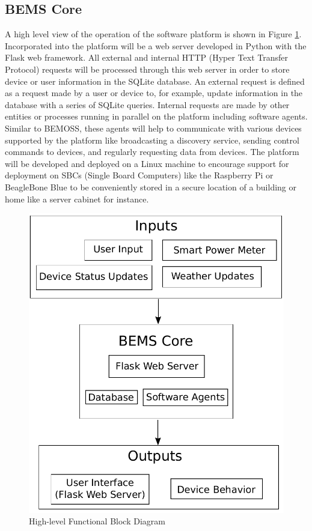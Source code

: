 \documentclass[12pt]{article} %
\begin{document}
\subsection{BEMS Core}
A high level view of the operation of the software platform is shown in Figure \ref{fig:functionalBlockDiagram}. Incorporated into the platform will be a web server developed in Python with the Flask web framework. All external and internal HTTP (Hyper Text Transfer Protocol) requests will be processed through this web server in order to store device or user information in the SQLite database. An external request is defined as a request made by a user or device to, for example, update information in the database with a series of SQLite queries. Internal requests are made by other entities or processes running in parallel on the platform including software agents. Similar to BEMOSS, these agents will help to communicate with various devices supported by the platform like broadcasting a discovery service, sending control commands to devices, and regularly requesting data from devices. The platform will be developed and deployed on a Linux machine to encourage support for deployment on SBCs (Single Board Computers) like the Raspberry Pi or BeagleBone Blue to be conveniently stored in a secure location of a building or home like a server cabinet for instance.
\begin{figure}[H]
    \centering
    \includegraphics[scale=0.4]{figs/functionalBlockDiagram}
    \caption{High-level Functional Block Diagram}
    \label{fig:functionalBlockDiagram}
\end{figure}
\end{document}
